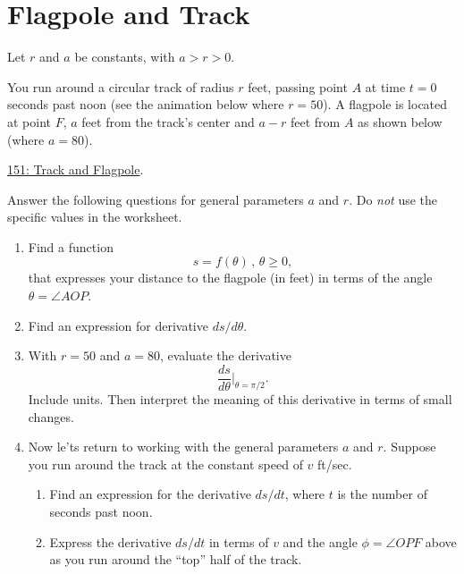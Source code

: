 \documentclass{ximera}
\begin{document}
\section{Flagpole and Track}


\begin{question} \label{QPEErmE}

Let $r$ and $a$ be constants, with $a>r>0$. 

You run around a circular track of radius $r$ feet, passing point $A$ at time $t=0$ seconds past noon (see the animation below where $r=50$). A flagpole is located at point $F$, $a$ feet from the track's center and $a-r$ feet from $A$ as shown below (where $a=80$). 


\href{https://www.desmos.com/calculator/xymelsnabl}{151: Track and Flagpole}.

 
\begin{onlineOnly}
    \begin{center}
\end{center}
\end{onlineOnly}

Answer the following questions for general parameters $a$ and $r$. Do \emph{not} use the specific values in the worksheet.

\begin{enumerate}

\item Find a function
\[
  s =f(\theta) \, , \, \theta \geq 0 ,
\]
that expresses your distance to the flagpole (in feet) in terms of the angle $\theta = \angle AOP$.

\item Find an expression for derivative $ds/d\theta$.

\item With $r=50$ and $a=80$, evaluate the derivative
\[
   \frac{ds}{d\theta}\Big|_{\theta=\pi/2} .
\]
Include units. Then interpret the meaning of this derivative in terms of small changes.

\item Now le'ts return to working with the general parameters $a$ and $r$. Suppose you run around the track at the constant speed of $v$ ft/sec.

\begin{enumerate}

\item Find an expression for the derivative $ds/dt$, where $t$ is the number of seconds past noon.

\item Express the derivative $ds/dt$ in terms of $v$ and the angle $\phi = \angle OPF$ above as you run around the ``top'' half of the track.


\end{enumerate}
\end{enumerate}
\end{question}
\end{document}
